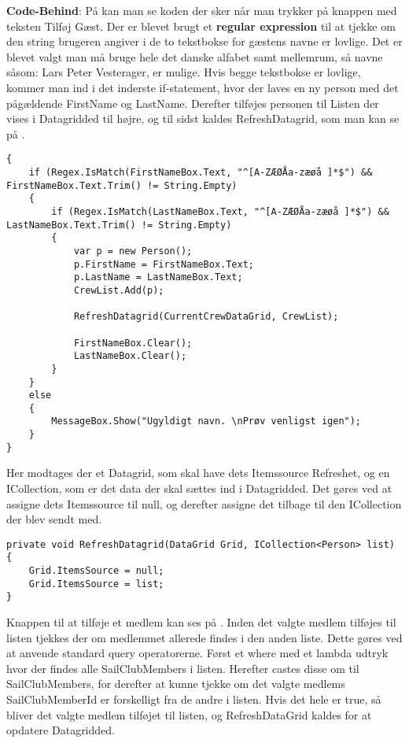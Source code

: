 \textbf{Code-Behind}: 
På  kan man se koden der sker når man trykker på knappen med teksten Tilføj Gæst.
Der er blevet brugt et \textbf{regular expression} til at tjekke om den string brugeren angiver i de to tekstbokse for gæstens navne er lovlige. 
Det er blevet valgt man må bruge hele det danske alfabet samt mellemrum, så navne såsom: Lars Peter Vesterager, er mulige.
Hvis begge tekstbokse er lovlige, kommer man ind i det inderste if-statement, hvor der laves en ny person med det pågældende FirstName og LastName. 
Derefter tilføjes personen til Listen der vises i Datagridded til højre, og til sidst kaldes RefreshDatagrid, som man kan se på .

\begin{lstlisting}[frame=single, caption=Add Guest Buttton, label=AddGuestButton]
{
    if (Regex.IsMatch(FirstNameBox.Text, "^[A-ZÆØÅa-zæøå ]*$") && FirstNameBox.Text.Trim() != String.Empty)
    {
        if (Regex.IsMatch(LastNameBox.Text, "^[A-ZÆØÅa-zæøå ]*$") && LastNameBox.Text.Trim() != String.Empty)
        {
            var p = new Person();
            p.FirstName = FirstNameBox.Text;
            p.LastName = LastNameBox.Text;
            CrewList.Add(p);

            RefreshDatagrid(CurrentCrewDataGrid, CrewList);

            FirstNameBox.Clear();
            LastNameBox.Clear();
        }
    }
    else
    {
        MessageBox.Show("Ugyldigt navn. \nPrøv venligst igen");
    }
}      
\end{lstlisting}

Her modtages der et Datagrid, som skal have dets Itemssource Refreshet, og en ICollection, som er det data der skal sættes ind i Datagridded. 
Det gøres ved at assigne dets Itemssource til null, og derefter assigne det tilbage til den ICollection der blev sendt med. 

\begin{lstlisting}[frame=single, caption=Refresh Datagrid, label=RefreshDatagrid]
private void RefreshDatagrid(DataGrid Grid, ICollection<Person> list)
{
    Grid.ItemsSource = null;
    Grid.ItemsSource = list;
}
\end{lstlisting}

Knappen til at tilføje et medlem kan ses på .
Inden det valgte medlem tilføjes til listen tjekkes der om medlemmet allerede findes i den anden liste. 
Dette gøres ved at anvende standard query operatorerne. 
Først et where med et lambda udtryk hvor der findes alle SailClubMembers i listen. 
Herefter castes disse om til SailClubMembers, for derefter at kunne tjekke om det valgte medlems SailClubMemberId er forskelligt fra de andre i listen. 
Hvis det hele er true, så bliver det valgte medlem tilføjet til listen, og RefreshDataGrid kaldes for at opdatere Datagridded.


